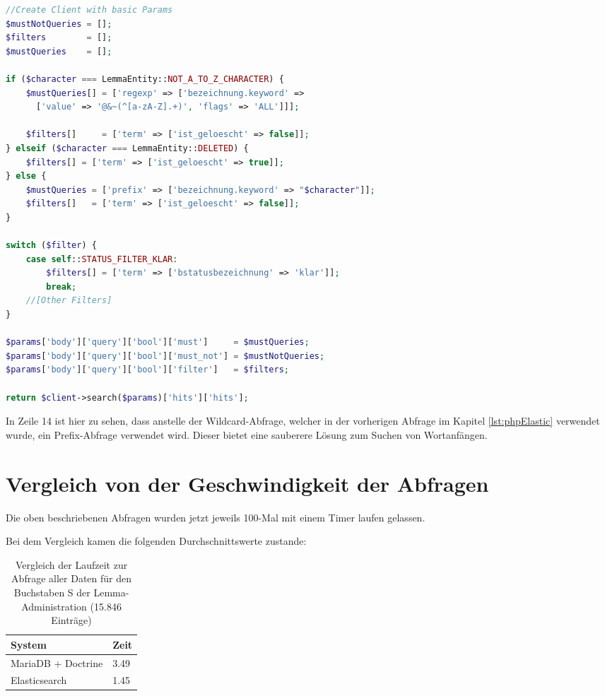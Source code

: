 \begin{lstlisting}[language=PHP, frame=single, label={lst:queryEla}, caption=Abfrage an Elasticsearch in PHP,captionpos=b] 
//Create Client with basic Params
$mustNotQueries = [];
$filters        = [];
$mustQueries    = [];

if ($character === LemmaEntity::NOT_A_TO_Z_CHARACTER) {
    $mustQueries[] = ['regexp' => ['bezeichnung.keyword' => 
      ['value' => '@&~(^[a-zA-Z].+)', 'flags' => 'ALL']]];
      
    $filters[]     = ['term' => ['ist_geloescht' => false]];
} elseif ($character === LemmaEntity::DELETED) {
    $filters[] = ['term' => ['ist_geloescht' => true]];
} else {
    $mustQueries = ['prefix' => ['bezeichnung.keyword' => "$character"]];
    $filters[]   = ['term' => ['ist_geloescht' => false]];
}

switch ($filter) {
    case self::STATUS_FILTER_KLAR:
        $filters[] = ['term' => ['bstatusbezeichnung' => 'klar']];
        break;
    //[Other Filters]
}

$params['body']['query']['bool']['must']     = $mustQueries;
$params['body']['query']['bool']['must_not'] = $mustNotQueries;
$params['body']['query']['bool']['filter']   = $filters;

return $client->search($params)['hits']['hits'];
\end{lstlisting}

In Zeile 14 ist hier zu sehen, dass anstelle der Wildcard-Abfrage, welcher in der vorherigen Abfrage im Kapitel \ref{lst:phpElastic} verwendet wurde, ein Prefix-Abfrage verwendet wird. Dieser bietet eine sauberere Lösung zum Suchen von Wortanfängen.

\section{Vergleich von der Geschwindigkeit der Abfragen}

Die oben beschriebenen Abfragen wurden jetzt jeweils 100-Mal mit einem Timer laufen gelassen. 

Bei dem Vergleich kamen die folgenden Durchschnittswerte zustande:
\begin{table} %
	\centering
		\begin{tabular}{l | l }
		    \textbf{System} & \textbf{Zeit} \\
        \hline
        MariaDB + Doctrine & 3.49 \\
        Elasticsearch      & 1.45  \\
		\end{tabular}
    \caption{Vergleich der Laufzeit zur Abfrage aller Daten für den Buchstaben S der Lemma-Administration (15.846 Einträge)}
    \label{vlgTimeDBvsEla}
\end{table}

